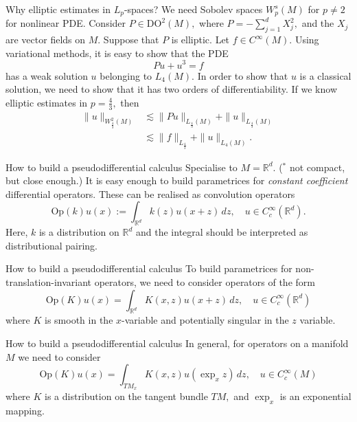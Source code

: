 \documentclass{beamer}
\numberwithin{equation}{section}
\theoremstyle{plain}
\theoremstyle{plain}
\theoremstyle{definition}
\theoremstyle{plain}
\theoremstyle{plain}
\theoremstyle{definition}
\newcommand{\Rl}{\mathbb{R}}
\newcommand{\Op}{\mathrm{Op}}
\begin{document}
\begin{frame}{Why elliptic estimates in $L_p$-spaces?}
    We need Sobolev spaces $W^s_p(M)$ for $p\neq 2$ for nonlinear PDE. 
    \pause
    Consider $P\in \mathrm{DO}^2(M),$ where $P = -\sum_{j=1}^d X_j^2,$ and the $X_j$ are vector fields on $M.$ Suppose that $P$ is elliptic.
    \pause
    Let $f \in C^\infty(M).$ Using variational methods, it is easy to show that the PDE
    \[
        Pu+u^3 = f
    \]
    has a weak solution $u$ belonging to $L_4(M).$ In order to show that $u$ is a classical solution, we need to show that it has two orders of differentiability.
    \pause
    If we know elliptic estimates in $p=\frac{4}{3},$ then
    \begin{align*}
        \|u\|_{W^2_{\frac{4}{3}}(M)} &\lesssim \|Pu\|_{L_{\frac{4}{3}}(M)}+\|u\|_{L_{\frac{4}{3}}(M)}\\
                                     &\lesssim \|f\|_{L_{\frac{4}{3}}}+\|u\|_{L_4(M)}.
    \end{align*}
\end{frame}

\begin{frame}{How to build a pseudodifferential calculus}
    Specialise to $M = \Rl^d.$ \pause ($^*$ not compact, but close enough.)
    \pause
    It is easy enough to build parametrices for \emph{constant coefficient} differential operators. These can be realised as convolution operators
    \[
        \Op(k)u(x) := \int_{\Rl^d} k(z)u(x+z)\,dz,\quad u\in C^\infty_c(\Rl^d).
    \]
    Here, $k$ is a distribution on $\Rl^d$ and the integral should be interpreted as distributional pairing.
\end{frame}

\begin{frame}{How to build a pseudodifferential calculus}
    To build parametrices for non-translation-invariant operators, we need to consider operators of the form
    \[
        \Op(K)u(x) = \int_{\Rl^d} K(x,z)u(x+z)\, dz,\quad u\in C^\infty_c(\Rl^d)
    \]
    where $K$ is smooth in the $x$-variable and potentially singular in the $z$ variable.
\end{frame}

\begin{frame}{How to build a pseudodifferential calculus}
    In general, for operators on a manifold $M$ we need to consider
    \[
        \Op(K)u(x) = \int_{TM_x} K(x,z)u(\exp_xz)\,dz,\quad u\in C^\infty_c(M)
    \]
    where $K$ is a distribution on the tangent bundle $TM,$ and $\exp_x$ is an exponential mapping.
\end{frame}
\end{document}
